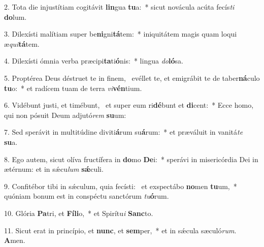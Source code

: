 2. Tota die injustítiam cogitávit \textbf{lin}gua \textbf{tu}a:~*  sicut novácula acúta fecís\textit{ti} \textbf{do}lum.\

3. Dilexísti malítiam super be\textbf{ni}gni\textbf{tá}tem:~*  iniquitátem magis quam loqui æ\textit{qui}\textbf{tá}tem.\

4. Dilexísti ómnia verba præcipi\textbf{ta}ti\textbf{ó}nis:~*  lingua \textit{do}\textbf{ló}sa.\

5. Proptérea Deus déstruet te in finem, \dag\  evéllet te, et emigrábit te de taber\textbf{ná}culo \textbf{tu}o:~*  et radícem tuam de terra \textit{vi}\textbf{vén}tium.\

6. Vidébunt justi, et timébunt, \dag\  et super eum ri\textbf{dé}bunt et \textbf{di}cent:~*  Ecce homo, qui non pósuit Deum adjutó\textit{rem} \textbf{su}um:\

7. Sed sperávit in multitúdine diviti\textbf{á}rum su\textbf{á}rum:~*  et præváluit in vanitá\textit{te} \textbf{su}a.\

8. Ego autem, sicut olíva fructífera in \textbf{do}mo \textbf{De}i:~*  sperávi in misericórdia Dei in ætérnum: et in sǽcu\textit{lum} \textbf{sǽ}culi.\

9. Confitébor tibi in sǽculum, quia fecísti: \dag\  et exspectábo \textbf{no}men \textbf{tu}um,~*  quóniam bonum est in conspéctu sanctórum \textit{tu}\textbf{ó}rum.\

10. Glória \textbf{Pa}tri, et \textbf{Fí}\textbf{li}o,~*  et Spirítu\textit{i} \textbf{Sanc}to.\

11. Sicut erat in princípio, et \textbf{nunc}, et \textbf{sem}per,~*  et in sǽcula sæculó\textit{rum}. \textbf{A}men.\

